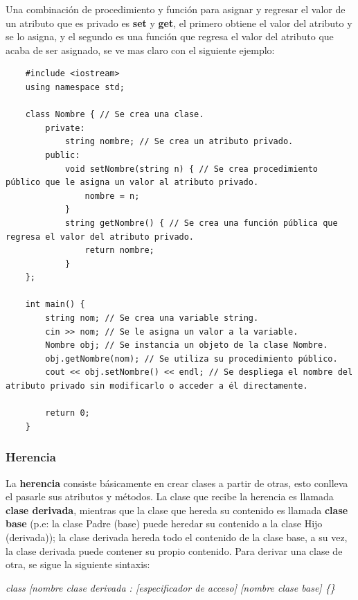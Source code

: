 Una combinación de procedimiento y función para asignar y regresar el valor de un atributo que es privado es \textbf{set} y \textbf{get}, el primero obtiene el valor del atributo y se lo asigna, y el segundo es una función que regresa el valor del atributo que acaba de ser asignado, se ve mas claro con el siguiente ejemplo:
\begin{lstlisting}
    #include <iostream>
    using namespace std;

    class Nombre { // Se crea una clase.
        private:
            string nombre; // Se crea un atributo privado.
        public:
            void setNombre(string n) { // Se crea procedimiento público que le asigna un valor al atributo privado.
                nombre = n;
            }
            string getNombre() { // Se crea una función pública que regresa el valor del atributo privado.
                return nombre;
            }
    };
    
    int main() {
        string nom; // Se crea una variable string.
        cin >> nom; // Se le asigna un valor a la variable.
        Nombre obj; // Se instancia un objeto de la clase Nombre.
        obj.getNombre(nom); // Se utiliza su procedimiento público.
        cout << obj.setNombre() << endl; // Se despliega el nombre del atributo privado sin modificarlo o acceder a él directamente.
        
        return 0;
    }
\end{lstlisting}


\subsubsection{Herencia}
\hspace{0.55cm}La \textbf{herencia} consiste básicamente en crear clases a partir de otras, esto conlleva el pasarle sus atributos y métodos. La clase que recibe la herencia es llamada \textbf{clase derivada}, mientras que la clase que hereda su contenido es llamada \textbf{clase base} (p.e: la clase Padre (base) puede heredar su contenido a la clase Hijo (derivada)); la clase derivada hereda todo el contenido de la clase base, a su vez, la clase derivada puede contener su propio contenido. Para derivar una clase de otra, se sigue la siguiente sintaxis:
\begin{center}
	\textit{class [nombre clase derivada : [especificador de acceso] [nombre clase base] \{\}}
\end{center}

